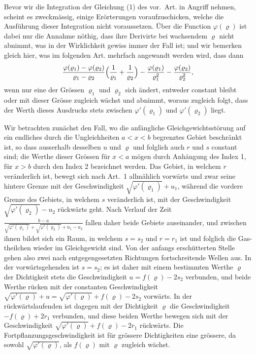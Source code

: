\documentclass[12pt,a4paper]{article}
\begin{document}
Bevor wir die Integration der Gleichung (1) des vor.~Art. in Angriff nehmen, scheint es zweckm\"assig, einige Er\"orterungen voraufzuschicken, welche die Ausf\"uhrung dieser Integration nicht voraussetzen. \"Uber die Function $\varphi(\varrho)$ ist dabei nur die Annahme n\"othig, dass ihre Derivirte bei wachsendem $\varrho$ nicht abnimmt, was in der Wirklichkeit gewiss immer der Fall ist; und wir bemerken gleich hier, was im folgenden Art. mehrfach angewandt werden wird, dass dann
\[
\frac{\varphi(\varrho_{1}) - \varphi(\varrho_{2})}{\varrho_{1} - \varrho_{2}}\Bigl(\frac{1}{\varrho_{1}} + \frac{1}{\varrho_{2}}\Bigr) - \frac{\varphi(\varrho_{1})}{\varrho_{1}^{2}} - \frac{\varphi(\varrho_{2})}{\varrho_{2}^{2}},
\]
 wenn nur eine der Gr\"ossen $\varrho_{1}$ und $\varrho_{2}$ sich \"andert, entweder constant bleibt oder mit dieser Gr\"osse zugleich w\"achst und abnimmt, woraus zugleich folgt, dass der Werth dieses Ausdrucks stets zwischen $\varphi'(\varrho_{1})$ und $\varphi'(\varrho_{2})$ liegt.

Wir betrachten zun\"achst den Fall, wo die anf\"angliche Gleichgewichtsst\"orung auf ein endliches durch die Ungleichheiten $a < x < b$ begrenztes Gebiet beschr\"ankt ist, so dass ausserhalb desselben $u$ und $\varrho$ und folglich auch $r$ und $s$ constant sind; die Werthe dieser Gr\"ossen f\"ur $x < a$ m\"ogen durch Anh\"angung des Index 1, f\"ur $x > b$ durch den Index 2 bezeichnet werden. Das Gebiet, in welchem $r$ ver\"anderlich ist, bewegt sich nach Art.~1 allm\"ahlich vorw\"arts und zwar seine hintere Grenze mit der Geschwindigkeit $\sqrt{\varphi'(\varrho_{1})} + u_{1}$, w\"ahrend die vordere Grenze des Gebiets, in welchem $s$ ver\"anderlich ist, mit der Geschwindigkeit $\sqrt{\varphi'(\varrho_{2})} - u_{2}$ r\"uckw\"arts geht. Nach Verlauf der Zeit $\frac{b-a}{\sqrt{\varphi'(\varrho_{1})} + \sqrt{\varphi'(\varrho_{2})} + u_{1} - u_{2}}$ fallen daher beide Gebiete auseinander, und zwischen ihnen bildet sich ein Raum, in welchem $s = s_{2}$ und $r = r_{1}$ ist und folglich die Gas-theilchen wieder im Gleichgewicht sind. Von der anfangs ersch\"utterten Stelle gehen also zwei nach entgegengesetzten Richtungen fortschreitende Wellen aus. In der vorw\"artsgehenden ist $s = s_{2}$; es ist daher mit einem bestimmten Werthe $\varrho$ der Dichtigkeit stets die Geschwindigkeit $u = f(\varrho) - 2s_{2}$ verbunden, und beide Werthe r\"ucken mit der constanten Geschwindigkeit $\sqrt{\varphi'(\varrho)} + u = \sqrt{\varphi'(\varrho)} + f(\varrho) - 2s_{2}$ vorw\"arts. In der r\"uckw\"artslaufenden ist dagegen mit der Dichtigkeit $\varrho$ die Geschwindigkeit $-f(\varrho) + 2r_{1}$ verbunden, und diese beiden Werthe bewegen sich mit der Geschwindigkeit $\sqrt{\varphi'(\varrho)} + f(\varrho) - 2r_{1}$ r\"uckw\"arts. Die Fortpflanzungsgeschwindigkeit ist f\"ur gr\"ossere Dichtigkeiten eine gr\"ossere, da sowohl $\sqrt{\varphi'(\varrho)}$, als $f(\varrho)$ mit $\varrho$ zugleich w\"achst.
\end{document}
